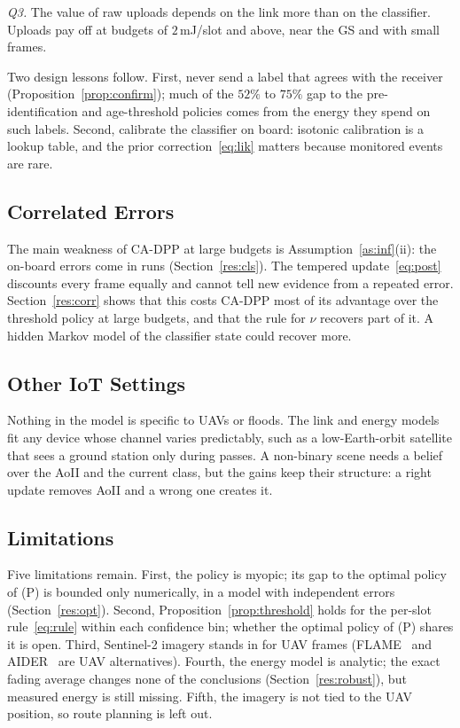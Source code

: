 \documentclass[5p,twocolumn]{elsarticle}
\theoremstyle{remark}
\begin{document}
\emph{Q3.} The value of raw uploads depends on the link more than on the classifier. Uploads pay off at budgets of $2$\,mJ/slot and above, near the GS and with small frames.

Two design lessons follow. First, never send a label that agrees with the receiver (Proposition~\ref{prop:confirm}); much of the $52\%$ to $75\%$ gap to the pre-identification and age-threshold policies comes from the energy they spend on such labels. Second, calibrate the classifier on board: isotonic calibration is a lookup table, and the prior correction~\eqref{eq:lik} matters because monitored events are rare.

\subsection{Correlated Errors}
The main weakness of CA-DPP at large budgets is Assumption~\ref{as:inf}(ii): the on-board errors come in runs (Section~\ref{res:cls}). The tempered update~\eqref{eq:post} discounts every frame equally and cannot tell new evidence from a repeated error. Section~\ref{res:corr} shows that this costs CA-DPP most of its advantage over the threshold policy at large budgets, and that the rule for $\nu$ recovers part of it. A hidden Markov model of the classifier state could recover more.

\subsection{Other IoT Settings}
Nothing in the model is specific to UAVs or floods. The link and energy models fit any device whose channel varies predictably, such as a low-Earth-orbit satellite that sees a ground station only during passes. A non-binary scene needs a belief over the AoII and the current class, but the gains keep their structure: a right update removes AoII and a wrong one creates it.

\subsection{Limitations}
Five limitations remain. First, the policy is myopic; its gap to the optimal policy of (P) is bounded only numerically, in a model with independent errors (Section~\ref{res:opt}). Second, Proposition~\ref{prop:threshold} holds for the per-slot rule~\eqref{eq:rule} within each confidence bin; whether the optimal policy of (P) shares it is open. Third, Sentinel-2 imagery stands in for UAV frames (FLAME~\cite{shamsoshoara2021flame} and AIDER~\cite{kyrkou2020aider} are UAV alternatives). Fourth, the energy model is analytic; the exact fading average changes none of the conclusions (Section~\ref{res:robust}), but measured energy is still missing. Fifth, the imagery is not tied to the UAV position, so route planning is left out.
\end{document}

